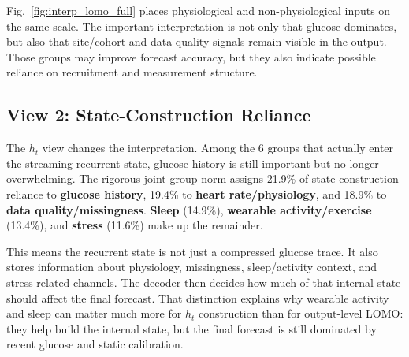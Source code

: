 Fig.~\ref{fig:interp_lomo_full} places physiological and non-physiological
inputs on the same scale.
The important interpretation is not only that glucose dominates, but also that
site/cohort and data-quality signals remain visible in the output.
Those groups may improve forecast accuracy, but they also indicate possible
reliance on recruitment and measurement structure.



\subsection{View 2: State-Construction Reliance}
\label{subsec:interp_h_t}

The $h_t$ view changes the interpretation.
Among the 6 groups that actually enter the streaming recurrent state, glucose
history is still important but no longer overwhelming.
The rigorous joint-group norm assigns 21.9\% of state-construction reliance to
\textbf{glucose history}, 19.4\% to \textbf{heart rate/physiology}, and 18.9\%
to \textbf{data quality/missingness}.
\textbf{Sleep} (14.9\%), \textbf{wearable activity/exercise} (13.4\%), and
\textbf{stress} (11.6\%) make up the remainder.

This means the recurrent state is not just a compressed glucose trace.
It also stores information about physiology, missingness, sleep/activity
context, and stress-related channels.
The decoder then decides how much of that internal state should affect the
final forecast.
That distinction explains why wearable activity and sleep can matter much more
for $h_t$ construction than for output-level LOMO: they help build the internal
state, but the final forecast is still dominated by recent glucose and static
calibration.

